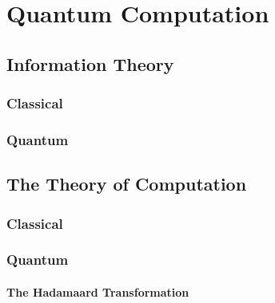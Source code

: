 
\chapter{Quantum Computation}
\label{chap:quantumComputation}
%

\section{Information Theory}

\subsection{Classical}

\subsection{Quantum}

\section{The Theory of Computation}


\subsection{Classical}

\subsection{Quantum}

\subsubsection{The Hadamaard Transformation}


